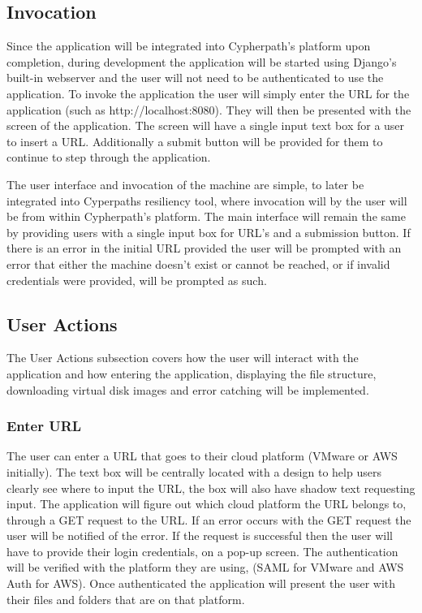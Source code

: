 \documentclass{article}
\begin{document}
        \subsection{Invocation}
        Since the application will be integrated into Cypherpath's platform upon completion, during development the application will be started using Django's built-in webserver and
        the user will not need to be authenticated to use the application. To invoke the application the user will simply enter the URL for the application (such as http://localhost:8080).
        They will then be presented with the screen of the application. The screen will have a single input text box for a user to insert a URL. Additionally 
        a submit button will be provided for them to continue to step through the application. 

        The user interface and invocation of the machine are simple, to later be integrated into Cyperpaths resiliency tool, where invocation will by the user will be from within Cypherpath's
        platform. The main interface will remain the same by providing users with a single input box for URL's and a submission button.
        If there is an error in the initial URL provided the user will be prompted with an error that either the machine doesn't exist or cannot be reached, or if invalid credentials 
        were provided, will be prompted as such.

        \subsection{User Actions}
        The User Actions subsection covers how the user will interact with the application and how entering the application, displaying the file structure, downloading virtual disk images and error catching 
        will be implemented.

            \subsubsection{Enter URL}
            The user can enter a URL that goes to their cloud platform (VMware or AWS initially). The text box will be centrally located with a design to help users clearly
            see where to input the URL, the box will also have shadow text requesting input. The application will figure out which cloud platform the URL belongs to, through a GET 
            request to the URL. If an error occurs with the GET request the user will be notified of the error. If the request is successful then the user will have to
            provide their login credentials, on a pop-up screen. The authentication will be verified with the platform they are using, (SAML for VMware and AWS Auth for AWS).
            Once authenticated the application will present the user with their files and folders that are on that platform.
            
\end{document}
